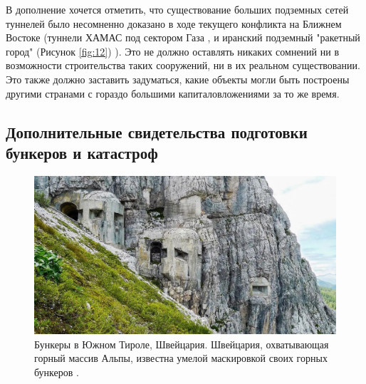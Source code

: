 \documentclass[10pt,twocolumn,letterpaper]{article}
\begin{document}
В дополнение хочется отметить, что существование больших подземных сетей туннелей было несомненно доказано в ходе текущего конфликта на Ближнем Востоке (туннели ХАМАС под сектором Газа \cite{38}, и иранский подземный "ракетный город" (Рисунок \ref{fig:12}) \cite{39,40}). Это не должно оставлять никаких сомнений ни в возможности строительства таких сооружений, ни в их реальном существовании. Это также должно заставить задуматься, какие объекты могли быть построены другими странами с гораздо большими капиталовложениями за то же время.

\subsection{Дополнительные свидетельства подготовки бункеров и катастроф}

\begin{figure}[t]
\begin{center}
   \includegraphics[width=1\linewidth]{tyrol.jpg}
\end{center}
   \caption{Бункеры в Южном Тироле, Швейцария. Швейцария, охватывающая горный массив Альпы, известна умелой маскировкой своих горных бункеров \cite{32}.}
\label{fig:7}
\label{fig:onecol}
\end{figure}
\end{document}
